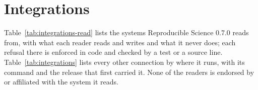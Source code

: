 \section{Integrations}
\label{sec:integrations}

Table~\ref{tab:integrations-read} lists the systems Reproducible Science 0.7.0 reads from, with
what each reader reads and writes and what it never does; each refusal there is enforced in code
and checked by a test or a source line. Table~\ref{tab:integrations} lists every other connection by
where it runs, with its command and the release that first carried it. None of the readers is endorsed
by or affiliated with the system it reads.

